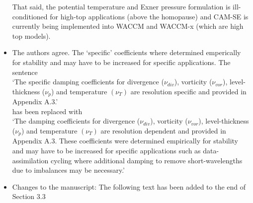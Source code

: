 \documentclass[11pt]{article}
\begin{document}
\begin{itemize}
That said, the potential temperature and Exner pressure formulation is ill-conditioned for high-top applications (above the homopause) and CAM-SE is currently being implemented into WACCM and WACCM-x (which are high top models).



\item {\color{red}{Also in section 2.6: You make reference to the ``specific damping coefficients''. Shouldn't these be runtime-parameters? I presume that the best value of the damping will depend on the application (for example, data assimilation cycling may benefit from additional damping to remove short-wavelength waves due to imbalances) and may not be a simple function of resolution.}}

The authors agree. The `specific' coefficients where determined emperically for stability and may have to be increased for specific applications. The sentence\\

`The specific damping coefficients for divergence ($\nu_{div}$), vorticity ($\nu_{vor}$), level-thickness ($\nu_p$) and temperature $(\nu_T)$ are resolution specific and provided in Appendix A.3.'\\

has been replaced with \\

`The damping coefficients for divergence ($\nu_{div}$), vorticity ($\nu_{vor}$), level-thickness ($\nu_p$) and temperature $(\nu_T)$ are resolution dependent and provided in Appendix A.3. These coefficients were determined empirically for stability and may have to be increased for specific applications such as data-assimilation cycling where additional damping to remove short-wavelengths due to imbalances may be necessary.'

\item {\color{red}{ Section 3.3: I am unfamiliar with the spectral element method. In traditional finite-differencing schemes there is a well defined way for each grid point to be influenced by its neighbors. How does each element communicate with one another? Is it by the shared points on the edges of each element? Also, if indeed it is only by the edge points, then wouldn't a broader domain of dependence (with more points) be needed for a higher-order method?}}

Changes to the manuscript: The following text has been added to the end of Section 3.3\\


\end{itemize}
\end{document}
